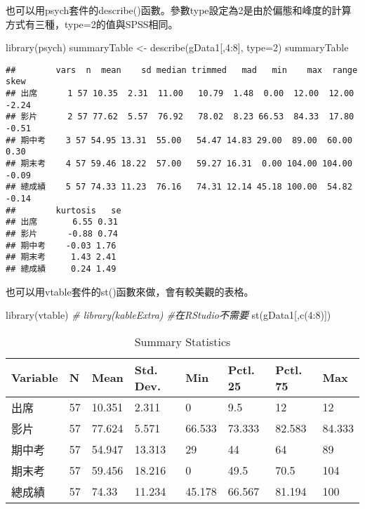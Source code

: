 \documentclass[
]{book}
\newenvironment{Shaded}{\begin{snugshade}}{\end{snugshade}}
\newcommand{\AttributeTok}[1]{\textcolor[rgb]{0.77,0.63,0.00}{#1}}
\newcommand{\CommentTok}[1]{\textcolor[rgb]{0.56,0.35,0.01}{\textit{#1}}}
\newcommand{\DecValTok}[1]{\textcolor[rgb]{0.00,0.00,0.81}{#1}}
\newcommand{\FunctionTok}[1]{\textcolor[rgb]{0.00,0.00,0.00}{#1}}
\newcommand{\NormalTok}[1]{#1}
\newcommand{\OtherTok}[1]{\textcolor[rgb]{0.56,0.35,0.01}{#1}}
\newcommand{\SpecialCharTok}[1]{\textcolor[rgb]{0.00,0.00,0.00}{#1}}
\begin{document}
也可以用psych套件的describe()函數。參數type設定為2是由於偏態和峰度的計算方式有三種，type=2的值與SPSS相同。

\begin{Shaded}
\begin{Highlighting}[]
\FunctionTok{library}\NormalTok{(psych)}
\NormalTok{summaryTable }\OtherTok{\textless{}{-}} \FunctionTok{describe}\NormalTok{(gData1[,}\DecValTok{4}\SpecialCharTok{:}\DecValTok{8}\NormalTok{], }\AttributeTok{type=}\DecValTok{2}\NormalTok{)}
\NormalTok{summaryTable}
\end{Highlighting}
\end{Shaded}

\begin{verbatim}
##        vars  n  mean    sd median trimmed   mad   min    max  range  skew
## 出席      1 57 10.35  2.31  11.00   10.79  1.48  0.00  12.00  12.00 -2.24
## 影片      2 57 77.62  5.57  76.92   78.02  8.23 66.53  84.33  17.80 -0.51
## 期中考    3 57 54.95 13.31  55.00   54.47 14.83 29.00  89.00  60.00  0.30
## 期末考    4 57 59.46 18.22  57.00   59.27 16.31  0.00 104.00 104.00 -0.09
## 總成績    5 57 74.33 11.23  76.16   74.31 12.14 45.18 100.00  54.82 -0.14
##        kurtosis   se
## 出席       6.55 0.31
## 影片      -0.88 0.74
## 期中考    -0.03 1.76
## 期末考     1.43 2.41
## 總成績     0.24 1.49
\end{verbatim}

也可以用vtable套件的st()函數來做，會有較美觀的表格。

\begin{Shaded}
\begin{Highlighting}[]
\FunctionTok{library}\NormalTok{(vtable)}
\CommentTok{\# library(kableExtra) \#在RStudio不需要}
\FunctionTok{st}\NormalTok{(gData1[,}\FunctionTok{c}\NormalTok{(}\DecValTok{4}\SpecialCharTok{:}\DecValTok{8}\NormalTok{)])}
\end{Highlighting}
\end{Shaded}

\begin{table}

\caption{\label{tab:unnamed-chunk-29}Summary Statistics}
\centering
\begin{tabular}[t]{llllllll}
\toprule
Variable & N & Mean & Std. Dev. & Min & Pctl. 25 & Pctl. 75 & Max\\
\midrule
出席 & 57 & 10.351 & 2.311 & 0 & 9.5 & 12 & 12\\
影片 & 57 & 77.624 & 5.571 & 66.533 & 73.333 & 82.583 & 84.333\\
期中考 & 57 & 54.947 & 13.313 & 29 & 44 & 64 & 89\\
期末考 & 57 & 59.456 & 18.216 & 0 & 49.5 & 70.5 & 104\\
總成績 & 57 & 74.33 & 11.234 & 45.178 & 66.567 & 81.194 & 100\\
\bottomrule
\end{tabular}
\end{table}
\end{document}
